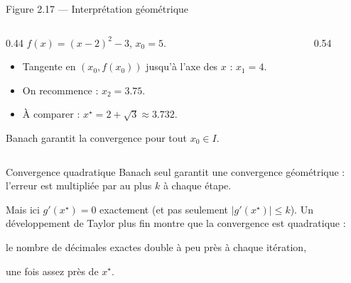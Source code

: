 \begin{frame}{Figure 2.17 --- Interprétation géométrique}
  \begin{columns}[c]
    \begin{column}{0.44\textwidth}
      \small $f(x)=(x-2)^2-3$, $x_0=5$.
      \begin{itemize}
        \item Tangente en $(x_0,f(x_0))$ jusqu'à l'axe des $x$ :
          $x_1=4$.
        \item On recommence : $x_2=\num{3.75}$.
        \item À comparer : $x^\star=2+\sqrt3\approx\num{3.732}$.
      \end{itemize}
      \vspace{4pt}
      Banach garantit la convergence pour tout $x_0\in I$.
    \end{column}
    \begin{column}{0.54\textwidth}
    \end{column}
  \end{columns}
\end{frame}

\begin{frame}{Convergence quadratique}
  \small Banach seul garantit une convergence géométrique :
  l'erreur est multipliée par au plus $k$ à chaque étape.
  \vspace{6pt}

  Mais ici $g'(x^\star)=0$ exactement (et pas seulement
  $|g'(x^\star)|\leq k$). Un développement de Taylor plus fin montre que
  la convergence est quadratique :
  \begin{center}
    le nombre de décimales exactes double à peu près à chaque
    itération,
  \end{center}
  une fois assez près de $x^\star$.
\end{frame}

